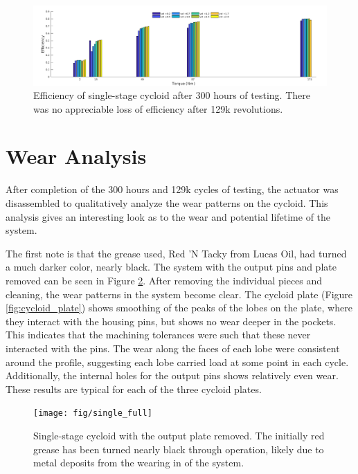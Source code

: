 \begin{figure}[!t]
   \centering
   \includegraphics[width=0.8\linewidth]{fig/eff_final}
   \caption{Efficiency of single-stage cycloid after 300 hours of testing. There was no appreciable loss of efficiency after 129k revolutions. }
   \label{fig:eff_results_final}
\end{figure}

\section{Wear Analysis} \label{ch:single:wear_analysis}

After completion of the 300 hours and 129k cycles of testing, the actuator was disassembled to qualitatively analyze the wear patterns on the cycloid. This analysis gives an interesting look as to the wear and potential lifetime of the system. 

The first note is that the grease used, Red 'N Tacky from Lucas Oil, had turned a much darker color, nearly black. The system with the output pins and plate removed can be seen in Figure \ref{fig:single_full}. After removing the individual pieces and cleaning, the wear patterns in the system become clear. The cycloid plate (Figure \ref{fig:cycloid_plate}) shows smoothing of the peaks of the lobes on the plate, where they interact with the housing pins, but shows no wear deeper in the pockets. This indicates that the machining tolerances were such that these never interacted with the pins. The wear along the faces of each lobe were consistent around the profile, suggesting each lobe carried load at some point in each cycle. Additionally, the internal holes for the output pins shows relatively even wear. These results are typical for each of the three cycloid plates. 

\begin{figure}[t]
   \centering
   \texttt{[image: fig/single\_full]}
   \caption{Single-stage cycloid with the output plate removed. The initially red grease has been turned nearly black through operation, likely due to metal deposits from the wearing in of the system.}
   \label{fig:single_full}
\end{figure}

